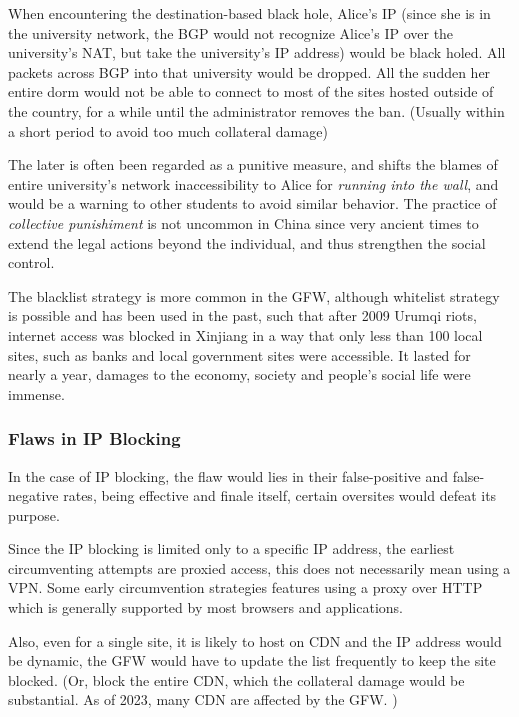 \documentclass[sigconf]{acmart}
\begin{document}
When encountering the destination-based black hole, Alice's IP (since
she is in the university network, the BGP would not recognize Alice's IP
over the university's NAT, but take the university's IP address) would
be black holed. All packets across BGP into that university would be
dropped. All the sudden her entire dorm would not be able to connect to
most of the sites hosted outside of the country, for a while until the
administrator removes the ban. (Usually within a short period to avoid
too much collateral damage)

The later is often been regarded as a punitive measure, and shifts the
blames of entire university's network inaccessibility to Alice for
\emph{running into the wall}, and would be a warning to other students
to avoid similar behavior. The practice of \emph{collective punishiment}
is not uncommon in China since very ancient times to extend the legal
actions beyond the individual, and thus strengthen the social control.
\cite{17_earlyChina}

The blacklist strategy is more common in the GFW, although whitelist
strategy is possible and has been used in the past, such that after 2009
Urumqi riots, internet access was blocked in Xinjiang in a way that only
less than 100 local sites, such as banks and local government sites were
accessible. \cite{10_missingLink} It lasted for nearly a year,
\cite{11_xinjiang} damages to the economy, society and people's social
life were immense.

\hypertarget{flaws-in-ip-blocking}{%
\subsubsection{Flaws in IP Blocking}\label{flaws-in-ip-blocking}}

In the case of IP blocking, the flaw would lies in their false-positive
and false-negative rates, being effective and finale itself, certain
oversites would defeat its purpose.

Since the IP blocking is limited only to a specific IP address, the
earliest circumventing attempts are proxied access, this does not
necessarily mean using a VPN. Some early circumvention strategies
features using a proxy over HTTP which is generally supported by most
browsers and applications. \cite{18_GFWSpaceTime}

Also, even for a single site, it is likely to host on CDN and the IP
address would be dynamic, the GFW would have to update the list
frequently to keep the site blocked. (Or, block the entire CDN, which
the collateral damage would be substantial. As of 2023, many CDN are
affected by the GFW. \cite{19_detect})
\end{document}
